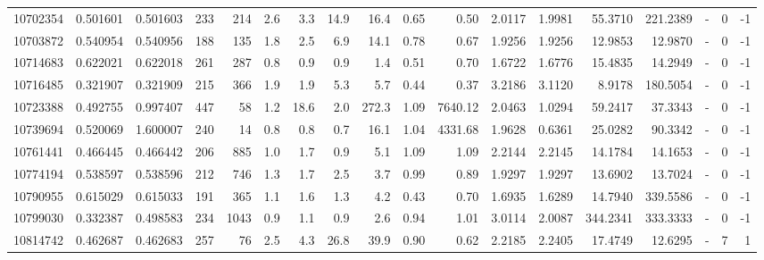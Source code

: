 \begin{tabular}{rrrrrrrrrrrrrrrlrr}
  10702354 & 0.501601 &   0.501603 &  233 &  214 &      2.6 &      3.3 &    14.9 &     16.4 &       0.65 &        0.50 &  2.0117 &  1.9981 &   55.3710 &  221.2389 &             - &        0 &         -1 \\
  10703872 & 0.540954 &   0.540956 &  188 &  135 &      1.8 &      2.5 &     6.9 &     14.1 &       0.78 &        0.67 &  1.9256 &  1.9256 &   12.9853 &   12.9870 &             - &        0 &         -1 \\
  10714683 & 0.622021 &   0.622018 &  261 &  287 &      0.8 &      0.9 &     0.9 &      1.4 &       0.51 &        0.70 &  1.6722 &  1.6776 &   15.4835 &   14.2949 &             - &        0 &         -1 \\
  10716485 & 0.321907 &   0.321909 &  215 &  366 &      1.9 &      1.9 &     5.3 &      5.7 &       0.44 &        0.37 &  3.2186 &  3.1120 &    8.9178 &  180.5054 &             - &        0 &         -1 \\
  10723388 & 0.492755 &   0.997407 &  447 &   58 &      1.2 &     18.6 &     2.0 &    272.3 &       1.09 &     7640.12 &  2.0463 &  1.0294 &   59.2417 &   37.3343 &             - &        0 &         -1 \\
  10739694 & 0.520069 &   1.600007 &  240 &   14 &      0.8 &      0.8 &     0.7 &     16.1 &       1.04 &     4331.68 &  1.9628 &  0.6361 &   25.0282 &   90.3342 &             - &        0 &         -1 \\
  10761441 & 0.466445 &   0.466442 &  206 &  885 &      1.0 &      1.7 &     0.9 &      5.1 &       1.09 &        1.09 &  2.2144 &  2.2145 &   14.1784 &   14.1653 &             - &        0 &         -1 \\
  10774194 & 0.538597 &   0.538596 &  212 &  746 &      1.3 &      1.7 &     2.5 &      3.7 &       0.99 &        0.89 &  1.9297 &  1.9297 &   13.6902 &   13.7024 &             - &        0 &         -1 \\
  10790955 & 0.615029 &   0.615033 &  191 &  365 &      1.1 &      1.6 &     1.3 &      4.2 &       0.43 &        0.70 &  1.6935 &  1.6289 &   14.7940 &  339.5586 &             - &        0 &         -1 \\
  10799030 & 0.332387 &   0.498583 &  234 & 1043 &      0.9 &      1.1 &     0.9 &      2.6 &       0.94 &        1.01 &  3.0114 &  2.0087 &  344.2341 &  333.3333 &             - &        0 &         -1 \\
  10814742 & 0.462687 &   0.462683 &  257 &   76 &      2.5 &      4.3 &    26.8 &     39.9 &       0.90 &        0.62 &  2.2185 &  2.2405 &   17.4749 &   12.6295 &             - &        7 &          1 \\

\end{tabular}

